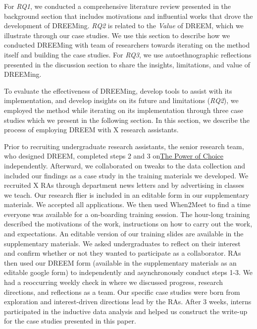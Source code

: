 For \textit{RQ1}, we conducted a comprehensive literature review presented in the background section that includes motivations and influential works that drove the development of DREEMing. \textit{RQ2} is related to the \textit{Value} of DREEM, which we illustrate through our case studies. We use this section to describe how we conducted DREEMing with team of researchers towards iterating on the method itself and building the case studies. For \textit{RQ3}, we use autoethnographic reflections presented in the discussion section to share the insights, limitations, and value of DREEMing. 

To evaluate the effectiveness of DREEMing, develop tools to assist with its implementation, and develop insights on its future and limitations (\textit{RQ2}), we employed the method while iterating on its implementation through {\color{red}three} case studies which we present in the following section. In this section, we describe the process of employing DREEM with {\color{red}X} research assistants.

Prior to recruiting undergraduate research assistants, the senior research team, who designed DREEM, completed steps 2 and 3 on\href{https://www.youtube.com/watch?v=B1sWtT-wShI}{The Power of Choice} independently. Afterward, we collaborated on tweaks to the data collection and included our findings as a case study in the training materials we developed. We recruited {\color{red}X} RAs through department news letters and by advertising in classes we teach. Our research flier is included in an editable form in our supplementary materials. We accepted all applications. We then used When2Meet to find a time everyone was available for a on-boarding training session. The hour-long training described the motivations of the work, instructions on how to carry out the work, and expectations. An editable version of our training slides are available in the supplementary materials. We asked undergraduates to reflect on their interest and confirm whether or not they wanted to participate as a collaborator. RAs then used our DREEM form (available in the supplementary materials as an editable google form) to independently and asynchronously conduct steps 1-3. We had a reoccurring weekly check in where we  discussed progress, research directions, and reflections as a team. Our specific case  studies were born from exploration and interest-driven directions lead by the RAs. After 3 weeks, interns participated in the inductive data analysis and helped us construct the write-up for the case studies presented in this paper.

